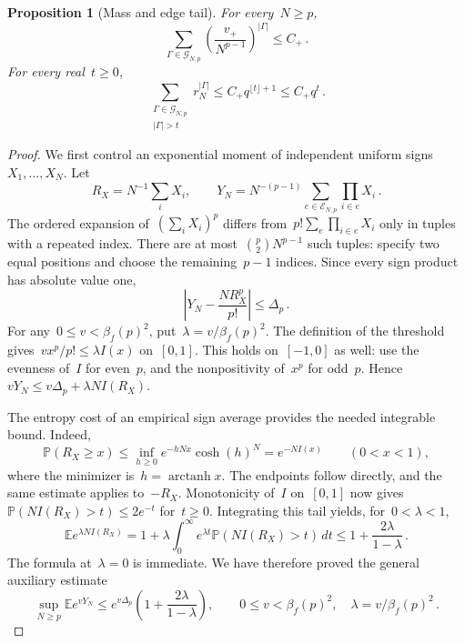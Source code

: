 \documentclass[10pt]{article}
\theoremstyle{plain}
\newtheorem{proposition}[theorem]{Proposition}
\theoremstyle{definition}
\theoremstyle{remark}
\begin{document}
\begin{proposition}[Mass and edge tail]\label{prop:mass}
For every~$N\ge p$,
\begin{equation}\label{eq:mass}
 \sum_{\Gamma\in\mathcal G_{N,p}}\left(\frac{v_+}{N^{p-1}}\right)^{|\Gamma|}\le C_+\,.
\end{equation}
For every real~$t\ge0$,
\begin{equation}\label{eq:edge-tail}
 \sum_{\substack{\Gamma\in\mathcal G_{N,p}\\|\Gamma|>t}}r_N^{|\Gamma|}
 \le C_+q^{\lfloor t\rfloor+1}\le C_+q^t\,.
\end{equation}
\end{proposition}
\begin{proof}
We first control an exponential moment of independent uniform signs~$X_1,\ldots,X_N$. Let
\begin{equation*}
 R_X=N^{-1}\sum_iX_i,\qquad Y_N=N^{-(p-1)}\sum_{e\in\mathcal E_{N,p}}\prod_{i\in e}X_i\,.
\end{equation*}
The ordered expansion of~$(\sum_iX_i)^p$ differs from~$p!\sum_e\prod_{i\in e}X_i$ only in tuples with a repeated index. There are at most~$\binom p2N^{p-1}$ such tuples: specify two equal positions and choose the remaining~$p-1$ indices. Since every sign product has absolute value one,
\begin{equation*}
 \left|Y_N-\frac{NR_X^p}{p!}\right|\le\Delta_p\,.
\end{equation*}
For any~$0\le v<\beta_f(p)^2$, put~$\lambda=v/\beta_f(p)^2$. The definition of the threshold gives~$vx^p/p!\le\lambda I(x)$ on~$[0,1]$. This holds on~$[-1,0]$ as well: use the evenness of~$I$ for even~$p$, and the nonpositivity of~$x^p$ for odd~$p$. Hence~$vY_N\le v\Delta_p+\lambda NI(R_X)$.

The entropy cost of an empirical sign average provides the needed integrable bound. Indeed,
\begin{equation*}
 \mathbb P(R_X\ge x)\le\inf_{h\ge0}e^{-hNx}\cosh(h)^N=e^{-NI(x)}\qquad(0<x<1),
\end{equation*}
where the minimizer is~$h=\operatorname{arctanh}x$. The endpoints follow directly, and the same estimate applies to~$-R_X$. Monotonicity of~$I$ on~$[0,1]$ now gives~$\mathbb P(NI(R_X)>t)\le2e^{-t}$ for~$t\ge0$. Integrating this tail yields, for~$0<\lambda<1$,
\begin{equation*}
 \mathbb E e^{\lambda NI(R_X)}
 =1+\lambda\int_0^\infty e^{\lambda t}\mathbb P(NI(R_X)>t)\,dt
 \le1+\frac{2\lambda}{1-\lambda}\,.
\end{equation*}
The formula at~$\lambda=0$ is immediate. We have therefore proved the general auxiliary estimate
\label{lem:exp-moment}
\begin{equation}\label{eq:exp-moment}
 \sup_{N\ge p}\mathbb E e^{vY_N}
 \le e^{v\Delta_p}\left(1+\frac{2\lambda}{1-\lambda}\right),
 \qquad 0\le v<\beta_f(p)^2,\quad\lambda=v/\beta_f(p)^2\,.
\end{equation}


\end{proof}
\end{document}
